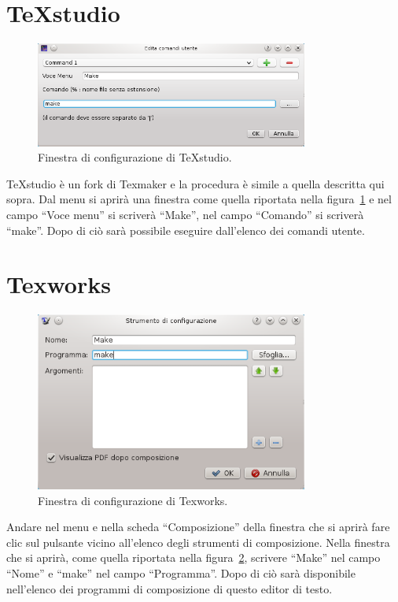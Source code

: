 \section{TeXstudio}
\label{sec:texstudio}

\begin{figure}
  \centering
  \includegraphics[width=0.8\textwidth]{figure/texstudio}
  \caption{Finestra di configurazione di TeXstudio.}
  \label{fig:texstudio}
\end{figure}
TeXstudio è un fork di Texmaker e la procedura è simile a quella descritta qui
sopra.  Dal menu  si aprirà
una finestra come quella riportata nella figura~\ref{fig:texstudio} e nel campo
``Voce menu'' si scriverà ``Make'', nel campo ``Comando'' si scriverà ``make''.
Dopo di ciò sarà possibile eseguire  dall'elenco dei comandi
utente.

\section{Texworks}
\label{sec:texworks}

\begin{figure}
  \centering
  \includegraphics[width=0.8\textwidth]{figure/texworks}
  \caption{Finestra di configurazione di Texworks.}
  \label{fig:texworks}
\end{figure}
Andare nel menu  e nella scheda ``Composizione''
della finestra che si aprirà fare clic sul pulsante \keys{{+}} vicino all'elenco
degli strumenti di composizione.  Nella finestra che si aprirà, come quella
riportata nella figura~\ref{fig:texworks}, scrivere ``Make'' nel campo ``Nome''
e ``make'' nel campo ``Programma''.  Dopo di ciò  sarà
disponibile nell'elenco dei programmi di composizione di questo editor di testo.

